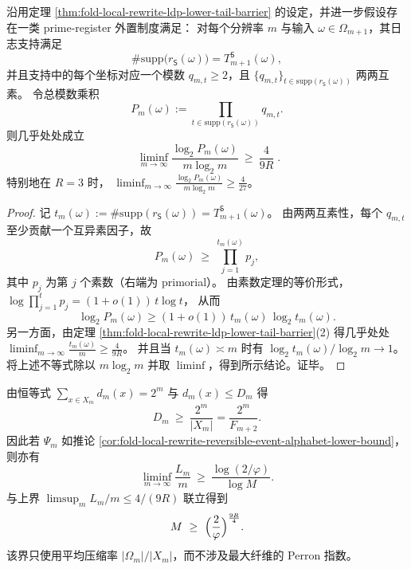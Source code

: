 \begin{corollary}\label{cor:fold-prime-register-bitlength-omega-mlogm}
沿用定理 \ref{thm:fold-local-rewrite-ldp-lower-tail-barrier} 的设定，并进一步假设存在一类 prime-register 外置制度满足：
对每个分辨率 \(m\) 与输入 \(\omega\in\Omega_{m+1}\)，其日志支持满足
\[
\#\mathrm{supp}\bigl(r_{\mathsf S}(\omega)\bigr)=T_{m+1}^{\mathsf S}(\omega),
\]
并且支持中的每个坐标对应一个模数 \(q_{m,t}\ge 2\)，且 \(\{q_{m,t}\}_{t\in \mathrm{supp}(r_{\mathsf S}(\omega))}\) 两两互素。
令总模数乘积
\[
P_m(\omega):=\prod_{t\in \mathrm{supp}(r_{\mathsf S}(\omega))} q_{m,t}.
\]
则几乎处处成立
\[
\boxed{\;
\liminf_{m\to\infty}\frac{\log_2 P_m(\omega)}{m\log_2 m}\ \ge\ \frac{4}{9R}\; }.
\]
特别地在 \(R=3\) 时，
\(
\liminf_{m\to\infty}\frac{\log_2 P_m(\omega)}{m\log_2 m}\ge \frac{4}{27}
\)。
\end{corollary}
\begin{proof}
记 \(t_m(\omega):=\#\mathrm{supp}(r_{\mathsf S}(\omega))=T_{m+1}^{\mathsf S}(\omega)\)。
由两两互素性，每个 \(q_{m,t}\) 至少贡献一个互异素因子，故
\[
P_m(\omega)\ \ge\ \prod_{j=1}^{t_m(\omega)} p_j,
\]
其中 \(p_j\) 为第 \(j\) 个素数（右端为 primorial）。
由素数定理的等价形式，
\(
\log\prod_{j=1}^{t}p_j=(1+o(1))\,t\log t
\)，
从而
\[
\log_2 P_m(\omega)
\ge (1+o(1))\,t_m(\omega)\,\log_2 t_m(\omega).
\]
另一方面，由定理 \ref{thm:fold-local-rewrite-ldp-lower-tail-barrier}(2) 得几乎处处
\(
\liminf_{m\to\infty}\frac{t_m(\omega)}{m}\ge \frac{4}{9R}
\)。
并且当 \(t_m(\omega)\asymp m\) 时有 \(\log_2 t_m(\omega)/\log_2 m\to 1\)。
将上述不等式除以 \(m\log_2 m\) 并取 \(\liminf\)，得到所示结论。证毕。
\end{proof}

\begin{remark}[平均缺口驱动的字母表下界]\label{rem:fold-local-rewrite-average-gap-alphabet-bound}
由恒等式 \(\sum_{x\in X_m}d_m(x)=2^m\) 与 \(d_m(x)\le D_m\) 得
\[
D_m\ \ge\ \frac{2^m}{|X_m|}=\frac{2^m}{F_{m+2}}.
\]
因此若 \(\Psi_m\) 如推论 \ref{cor:fold-local-rewrite-reversible-event-alphabet-lower-bound}，则亦有
\[
\liminf_{m\to\infty}\frac{L_m}{m}\ \ge\ \frac{\log(2/\varphi)}{\log M}.
\]
与上界 \(\limsup_m L_m/m\le 4/(9R)\) 联立得到
\[
M\ \ge\ \Bigl(\frac{2}{\varphi}\Bigr)^{\frac{9R}{4}}.
\]
该界只使用平均压缩率 \(|\Omega_m|/|X_m|\)，而不涉及最大纤维的 Perron 指数。
\end{remark}

